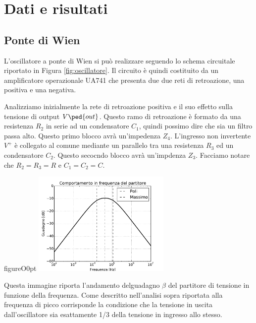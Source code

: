 \section*{Dati e risultati}

\subsection*{Ponte di Wien}

L'oscillatore a ponte di Wien si può realizzare seguendo lo schema circuitale riportato in Figura \ref{fig:oscillatore}.
Il circuito è quindi costituito da un amplificatore operazionale UA741 che presenta due due reti di retroazione, una positiva e una negativa.

Analizziamo inizialmente la rete di retroazione positiva e il suo effetto sulla tensione di output $V\ped{out}$.
Questo ramo di retroazione è formato da una resistenza $R_2$ in serie ad un condensatore $C_1$, quindi possimo dire che sia un filtro passa alto. Questo primo blocco avrà un'impedenza $Z_4$. L'ingresso non invertente $V^+$ è collegato al comune mediante un parallelo tra una resistenza $R_3$ ed un condensatore $C_2$. Questo secocndo blocco avrà un'impdenza $Z_3$. Facciamo notare che $R_2=R_3=R$ e $C_1=C_2=C$.

\begin{wrapfloat}{figure}{O}{0pt}
	\includegraphics[width=0.5\textwidth]{figure/ctp.pdf}
    \caption{Questa immagine riporta l'andamento delguadagno $\beta$ del partitore di tensione in funzione della frequenza. Come descritto nell'analisi sopra riportata alla frequenza di picco corrisponde la condizione che la tensione in uscita dall'oscillatore sia esattamente 1/3 della tensione in ingresso allo stesso.}
    \label{fig:guadagno_partitore}
\end{wrapfloat}

